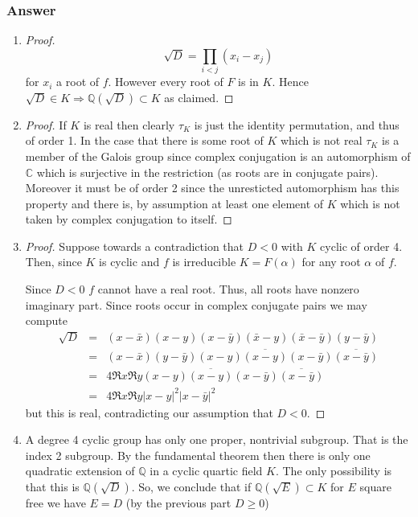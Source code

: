 \documentclass[10pt]{article}
\begin{document}
\subsubsection{Answer}
\begin{enumerate}
\item \begin{proof}
\[\sqrt D = \prod_{i <j} (x_i - x_j)\]
for $x_i$ a root of $f$. However every root of $F$ is in $K$. Hence $\sqrt D \in K \Rightarrow \mathbb{Q}(\sqrt D) \subset K$ as claimed. \end{proof}
\item \begin{proof} If $K$ is real then clearly $\tau_K$ is just the identity permutation, and thus of order 1. In the case that there is some root of $K$ which is not real $\tau_K$ is a member of the Galois group since complex conjugation is an automorphism of $\mathbb{C}$ which is surjective in the restriction (as roots are in conjugate pairs). Moreover it must be of order 2 since the unresticted automorphism has this property and there is, by assumption at least one element of $K$ which is not taken by complex conjugation to itself.\end{proof}
\item \begin{proof}Suppose towards a contradiction that $D<0$ with $K$ cyclic of order 4. Then, since $K$ is cyclic and $f$ is irreducible $K = F(\alpha)$ for any root $\alpha$ of $f$. 

Since $D<0$  $f$ cannot have a real root. Thus, all roots have nonzero imaginary part. Since roots occur in complex conjugate pairs we may compute 
\begin{eqnarray*}
\sqrt D &=& (x - \bar x)( x - y)( x - \bar y)(\bar x - y)( \bar x -\bar y)(y - \bar y)\\
&=& (x - \bar x)(y - \bar y) (x- y ) \overline{(x- y)} (x - \bar y) \overline{(x-\bar y)} \\
&=& 4 \Re x\Re y (x- y ) \overline{(x- y)} (x - \bar y) \overline{(x-\bar y)}\\
&=& 4 \Re x\Re y \left| x- y \right|^2\left| x - \bar y\right|^2
\end{eqnarray*}
but this is real,  contradicting our assumption that $D<0.$
\end{proof}
\item A degree 4 cyclic group has only one proper, nontrivial subgroup. That is the index 2 subgroup. By the fundamental theorem then there is only one quadratic extension of $\mathbb{Q}$ in a cyclic quartic field $K$. The only possibility is that this is $\mathbb{Q}(\sqrt D) $. So, we conclude that if $\mathbb{Q}(\sqrt E) \subset K$ for $E$ square free we have $E=D$ (by the previous part $D \geq 0$)
\end{enumerate}
\end{document}
